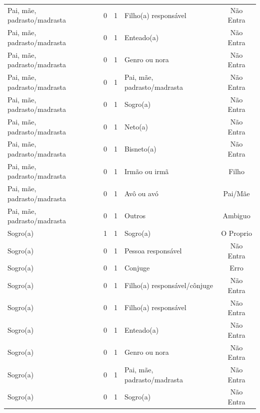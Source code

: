 \documentclass[
	12pt,				%
	openright,			%
	twoside,			%
	a4paper,			%
	english,			%
	french,				%
	spanish,			%
	brazil				%
	]{abntex2}
\begin{document}
\begin{anexosenv}
\begin{longtable}{@{}lcclc@{}}
Pai, mãe, padrasto/madrasta  & 0         & 1        & Filho(a) responsável         & Não Entra       \\
Pai, mãe, padrasto/madrasta  & 0         & 1        & Enteado(a)                   & Não Entra       \\
Pai, mãe, padrasto/madrasta  & 0         & 1        & Genro ou nora                & Não Entra       \\
Pai, mãe, padrasto/madrasta  & 0         & 1        & Pai, mãe, padrasto/madrasta  & Não Entra       \\
Pai, mãe, padrasto/madrasta  & 0         & 1        & Sogro(a)                     & Não Entra       \\
Pai, mãe, padrasto/madrasta  & 0         & 1        & Neto(a)                      & Não Entra       \\
Pai, mãe, padrasto/madrasta  & 0         & 1        & Bisneto(a)                   & Não Entra       \\
Pai, mãe, padrasto/madrasta  & 0         & 1        & Irmão ou irmã                & Filho           \\
Pai, mãe, padrasto/madrasta  & 0         & 1        & Avô ou avó                   & Pai/Mãe         \\
Pai, mãe, padrasto/madrasta  & 0         & 1        & Outros                       & Ambiguo         \\
Sogro(a)                     & 1         & 1        & Sogro(a)                     & O Proprio       \\
Sogro(a)                     & 0         & 1        & Pessoa responsável           & Não Entra       \\
Sogro(a)                     & 0         & 1        & Conjuge                      & Erro            \\
Sogro(a)                     & 0         & 1        & Filho(a) responsável/cônjuge & Não Entra       \\
Sogro(a)                     & 0         & 1        & Filho(a) responsável         & Não Entra       \\
Sogro(a)                     & 0         & 1        & Enteado(a)                   & Não Entra       \\
Sogro(a)                     & 0         & 1        & Genro ou nora                & Não Entra       \\
Sogro(a)                     & 0         & 1        & Pai, mãe, padrasto/madrasta  & Não Entra       \\
Sogro(a)                     & 0         & 1        & Sogro(a)                     & Não Entra       \\

\end{longtable}
\end{anexosenv}
\end{document}

